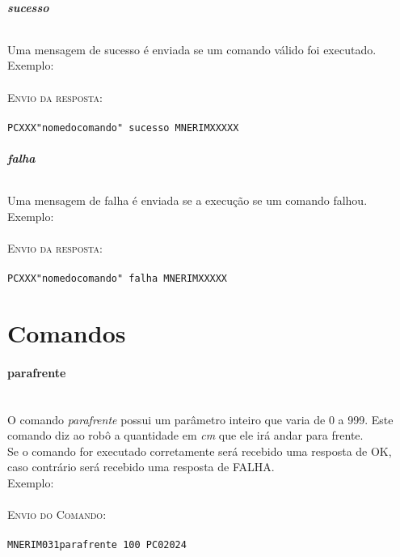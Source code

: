 \documentclass[11pt,	 papera4]{article}
\begin{document}
\paragraph{\textbf{sucesso} \newline \newline}

Uma mensagem de sucesso é enviada se um comando válido foi executado. 
\newline
Exemplo:\\\\ \hspace*{0.5cm} 
\textsc{Envio da resposta:} \\\\ \hspace*{2cm} \texttt{PCXXX"nomedocomando" sucesso MNERIMXXXXX} \\

\paragraph{\textbf{falha} \newline \newline}

Uma mensagem de falha é enviada se a execução se um comando falhou.
Exemplo:\\\\ \hspace*{0.5cm} 
\textsc{Envio da resposta:} \\\\ \hspace*{2cm} \texttt{PCXXX"nomedocomando" falha MNERIMXXXXX} \\

\newpage

\part*{Comandos \newline}


\subsection*{parafrente \\\\}
O comando \textit{parafrente} possui um parâmetro inteiro que varia de 0 a 999.  
Este comando diz ao robô a quantidade em \textit{cm} que ele irá andar para frente.\\
Se o comando for executado corretamente será recebido uma resposta de OK, caso contrário será recebido uma resposta de FALHA. \\ 
\newline
 Exemplo:\\\\ \hspace*{0.5cm} 
\textsc{Envio do Comando:} \\\\ \hspace*{2cm} \texttt{MNERIM031parafrente 100 PC02024} \\
\end{document}
